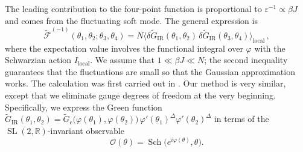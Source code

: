 \documentclass[12pt]{article}
\newcommand{\blangle}{\bigl\langle}
\newcommand{\brangle}{\bigr\rangle}
\newcommand*{\bcorr}[1]{\blangle{#1}\brangle}
\newcommand{\calF}{\mathcal{F}}
\newcommand{\calO}{\mathcal{O}}
\newcommand{\RR}{\mathbb{R}}
\DeclareMathOperator{\SL}{SL}
\DeclareMathOperator{\Sch}{Sch}
\newcommand{\cc}{\mathrm{c}}
\newcommand{\loc}{\text{local}}
\newcommand{\IR}{\text{IR}}
\newcommand{\tG}{\widetilde{G}}
\newcommand{\tF}{\widetilde{\calF}}
\newcommand{\vep}{\varepsilon}
\newcommand{\vp}{\varphi}
\begin{document}
The leading contribution to the four-point function is proportional to $\vep^{-1}\propto\beta J$ and comes from the fluctuating soft mode. The general expression is
\begin{equation}\label{F-1_def}
\tF^{(-1)}(\theta_1,\theta_2;\theta_3,\theta_4)
=N\bcorr{\delta\tG_{\IR}(\theta_1,\theta_2)\,
\delta\tG_{\IR}(\theta_3,\theta_4)}_{\loc}\,,
\end{equation}
where the expectation value involves the functional integral over $\vp$ with the Schwarzian action $I_{\loc}$. We assume that $1\ll\beta J\ll N$; the second inequality guarantees that the fluctuations are small so that the Gaussian approximation works. The calculation was first carried out in \cite{MS16}. Our method is very similar, except that we eliminate gauge degrees of freedom at the very beginning. Specifically, we express the Green function $\tG_{\IR}(\theta_1,\theta_2) =\tG_{\cc}\bigl(\vp(\theta_1),\vp(\theta_2)\bigr)\,
\vp'(\theta_1)^{\Delta}\vp'(\theta_2)^{\Delta}$ in terms of the $\SL(2,\RR)$-invariant observable
\begin{equation} \label{Odef}
\calO(\theta)=\Sch\bigl(e^{i\vp(\theta)},\theta\bigr).
\end{equation}
\end{document}
